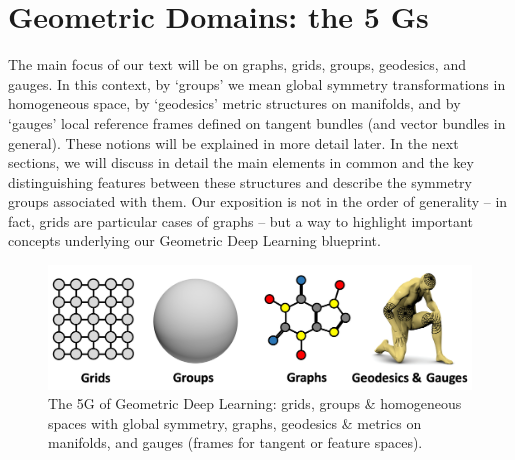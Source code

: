 \section{Geometric Domains: the 5 Gs}


%

The main focus of our text will be on graphs, grids, groups, geodesics, and  gauges. In this context, by `groups' we mean global symmetry transformations in homogeneous space, by `geodesics' metric structures on manifolds, and by `gauges' local reference frames defined on tangent bundles (and vector bundles in general).  
These notions will be explained in more detail later. 
%
%
In the next sections, we will discuss in detail the main elements in common and the key distinguishing features between these structures and describe the symmetry groups associated with them.
%
Our exposition is not in the order of generality -- in fact, grids are particular cases of graphs -- but a way to highlight important concepts underlying our Geometric Deep Learning blueprint.




\begin{figure}
    \centering
    \includegraphics[width=1\textwidth]{figures/5g.png}
    \caption{The 5G of Geometric Deep Learning: grids, groups \& homogeneous spaces with global symmetry, graphs, geodesics \& metrics on manifolds, and gauges (frames for tangent or feature spaces). }
    \label{fig:4g}
\end{figure}





